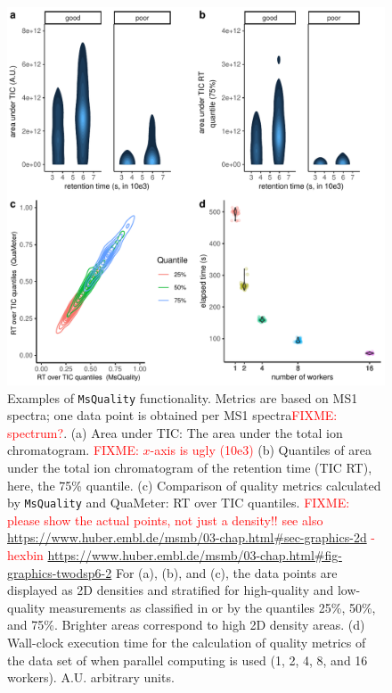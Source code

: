 \documentclass{bioinfo}
\newcommand{\fixme}[1]{\textcolor{red}{FIXME: #1}}
\begin{document}
\begin{figure}[ht!]
    \centering
 	\includegraphics[scale=0.421]{figure-main}
 	  \caption{Examples of \texttt{MsQuality} functionality. Metrics are based
 	        on MS1 spectra; one data point is obtained per MS1 spectra\fixme{spectrum?}.
 	        (a) Area under TIC: The area under the total ion chromatogram. \fixme{$x$-axis is ugly (10e3)}
            (b) Quantiles of area under the total ion
                chromatogram of the retention time (TIC RT), here, the 75\% quantile. 
            (c) Comparison of quality metrics calculated by \texttt{MsQuality} 
                and QuaMeter: RT over TIC quantiles. \fixme{please show the actual points, not just a density!! see also \url{https://www.huber.embl.de/msmb/03-chap.html\#sec-graphics-2d} - hexbin \url{https://www.huber.embl.de/msmb/03-chap.html\#fig-graphics-twodsp6-2}}
            For (a), (b), and (c), the data points are displayed 
                as 2D densities and stratified for high-quality and low-quality
                measurements as classified in \cite{Amidan2014} or by the
                quantiles 25\%, 50\%, and 75\%. Brighter areas correspond to 
                high 2D density areas.
            (d) Wall-clock execution time for the calculation of quality metrics of the 
                data set of \cite{Amidan2014} when parallel computing is used 
                (1, 2, 4, 8, and 16 workers). A.U. arbitrary units.
    } \label{fig:fig1}
\end{figure}
\end{document}
